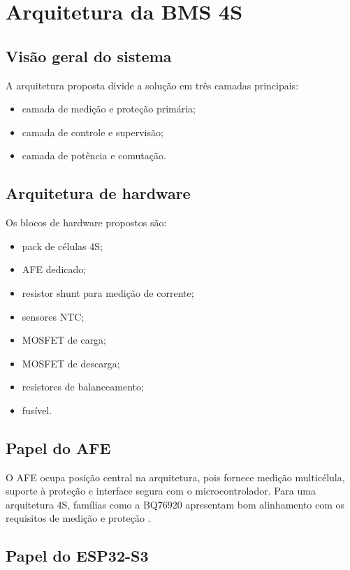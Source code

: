 \chapter{Arquitetura da BMS 4S}

\section{Visão geral do sistema}

A arquitetura proposta divide a solução em três camadas principais:

\begin{itemize}
  \item camada de medição e proteção primária;
  \item camada de controle e supervisão;
  \item camada de potência e comutação.
\end{itemize}

\section{Arquitetura de hardware}

Os blocos de hardware propostos são:

\begin{itemize}
  \item pack de células 4S;
  \item AFE dedicado;
  \item resistor shunt para medição de corrente;
  \item sensores NTC;
  \item MOSFET de carga;
  \item MOSFET de descarga;
  \item resistores de balanceamento;
  \item fusível.
\end{itemize}

\section{Papel do AFE}

O AFE ocupa posição central na arquitetura, pois fornece medição multicélula, suporte à proteção
e interface segura com o microcontrolador. Para uma arquitetura 4S, famílias como a BQ76920
apresentam bom alinhamento com os requisitos de medição e proteção \cite{ti_bq76920}.

\section{Papel do ESP32-S3}

